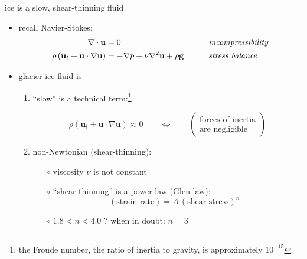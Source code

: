 \documentclass[10pt,hyperref={pdfpagelabels=true}]{beamer}
\begin{document}
\begin{frame}{ice is a slow, shear-thinning fluid}

\begin{itemize}
\item recall Navier-Stokes:
\small
\begin{align*}
\nabla \cdot \mathbf{u} &= 0 &&\qquad \text{\emph{incompressibility}} \\
\rho \left(\mathbf{u}_t + \mathbf{u}\cdot\nabla \mathbf{u}\right) &= -\nabla p + \nu \nabla^2 \mathbf{u} + \rho \mathbf{g} &&\qquad \text{\emph{stress balance}}
\end{align*}
\normalsize
\item glacier ice fluid is
  \begin{enumerate}
  \item ``slow'' is a technical term:\footnote{the Froude number, the ratio of inertia to gravity, is approximately $10^{-15}$}

\vspace{-3mm}
    $$\rho \left(\mathbf{u}_t + \mathbf{u}\cdot\nabla \mathbf{u}\right) \approx 0 \qquad \iff \qquad \begin{pmatrix} \text{forces of inertia} \\ \text{are negligible} \end{pmatrix}$$
  \item non-Newtonian (shear-thinning):

    \begin{itemize}
    \item[$\circ$] viscosity $\nu$ is not constant
    \item[$\circ$] ``shear-thinning'' is a power law (Glen law):
        $$(\text{strain rate}) = A\, (\text{shear stress})^n$$
    \item[$\circ$] $1.8 < n < 4.0$ ?  \quad when in doubt: \alert{$n=3$}
    \end{itemize}
  \end{enumerate}
\end{itemize}
\end{frame}
\end{document}
